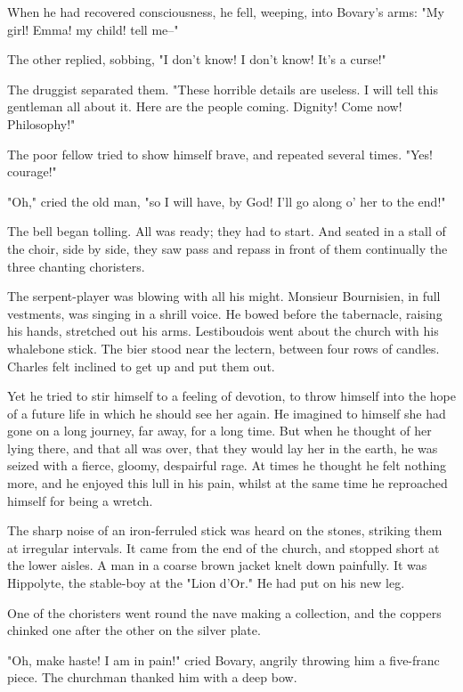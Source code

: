 \documentclass{tufte-book}
\begin{document}
When he had recovered consciousness, he fell, weeping, into Bovary's
arms: "My girl! Emma! my child! tell me--"

The other replied, sobbing, "I don't know! I don't know! It's a curse!"

The druggist separated them. "These horrible details are useless. I will
tell this gentleman all about it. Here are the people coming. Dignity!
Come now! Philosophy!"

The poor fellow tried to show himself brave, and repeated several times.
"Yes! courage!"

"Oh," cried the old man, "so I will have, by God! I'll go along o' her
to the end!"

The bell began tolling. All was ready; they had to start. And seated in
a stall of the choir, side by side, they saw pass and repass in front of
them continually the three chanting choristers.

The serpent-player was blowing with all his might. Monsieur Bournisien,
in full vestments, was singing in a shrill voice. He bowed before the
tabernacle, raising his hands, stretched out his arms. Lestiboudois
went about the church with his whalebone stick. The bier stood near the
lectern, between four rows of candles. Charles felt inclined to get up
and put them out.

Yet he tried to stir himself to a feeling of devotion, to throw himself
into the hope of a future life in which he should see her again. He
imagined to himself she had gone on a long journey, far away, for a long
time. But when he thought of her lying there, and that all was over,
that they would lay her in the earth, he was seized with a fierce,
gloomy, despairful rage. At times he thought he felt nothing more, and
he enjoyed this lull in his pain, whilst at the same time he reproached
himself for being a wretch.

The sharp noise of an iron-ferruled stick was heard on the stones,
striking them at irregular intervals. It came from the end of the
church, and stopped short at the lower aisles. A man in a coarse brown
jacket knelt down painfully. It was Hippolyte, the stable-boy at the
"Lion d'Or." He had put on his new leg.

One of the choristers went round the nave making a collection, and the
coppers chinked one after the other on the silver plate.

"Oh, make haste! I am in pain!" cried Bovary, angrily throwing him a
five-franc piece. The churchman thanked him with a deep bow.
\end{document}
